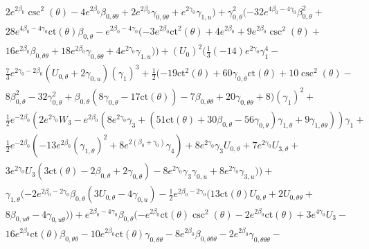 \documentclass[a4paper,11pt]{article}
\numberwithin{equation}{section}
\begin{document}
\begin{align*}
&2 e^{2 \beta_{0}} \csc ^2(\theta )-4 e^{2 \beta_{0}} \beta_{0, \theta \theta}+2 e^{2 \beta_{0}} \gamma_{0, \theta \theta}+e^{2 \gamma_{0}} \gamma_{1,u})+\gamma_{0, \theta}^2 (-32 e^{4 \beta_{0}-4 \gamma_{0}} \beta_{0, \theta}^2+\\
&28 e^{4 \beta_{0}-4 \gamma_{0}} \text{ct}(\theta ) \beta_{0, \theta}-e^{2 \beta_{0}-4 \gamma_{0}} (-3 e^{2 \beta_{0}} \text{ct}^2(\theta )+4 e^{2 \beta_{0}}+9 e^{2 \beta_{0}} \csc ^2(\theta )+\\
&16 e^{2 \beta_{0}} \beta_{0, \theta \theta}+18 e^{2 \beta_{0}} \gamma_{0, \theta \theta}+4 e^{2 \gamma_{0}} \gamma_{1,u}))+(U_{0})^2 (\frac{1}{3} (-14) e^{2 \gamma_{0}} \gamma_{1}^4-\\
&\frac{7}{3} e^{2 \gamma_{0}-2 \beta_{0}} (U_{0, \theta}+2 \gamma_{0,u}) (\gamma_{1})^3+\frac{1}{2} (-19 \text{ct}^2(\theta )+60 \gamma_{0, \theta} \text{ct}(\theta )+10 \csc ^2(\theta )-\\
&8 \beta_{0, \theta}^2-32 \gamma_{0, \theta}^2+\beta_{0, \theta} (8 \gamma_{0, \theta}-17 \text{ct}(\theta ))-7 \beta_{0, \theta \theta}+20 \gamma_{0, \theta \theta}+8) (\gamma_{1})^2+\\
&\frac{1}{2} e^{-2 \beta_{0}} (2 e^{2 \gamma_{0}} W_{3}-e^{2 \beta_{0}} (8 e^{2 \gamma_{0}} \gamma_{3}+(51 \text{ct}(\theta )+30 \beta_{0, \theta}-56 \gamma_{0, \theta}) \gamma_{1, \theta}+9 \gamma_{1, \theta \theta})) \gamma_{1}+\\
&\frac{1}{2} e^{-2 \beta_{0}} (-13 e^{2 \beta_{0}} (\gamma_{1, \theta})^2+8 e^{2 (\beta_{0}+\gamma_{0})}\gamma_{4})+8 e^{2 \gamma_{0}} \gamma_{3} U_{0, \theta}+7 e^{2 \gamma_{0}} U_{3, \theta}+\\
&3 e^{2 \gamma_{0}} U_{3} (3 \text{ct}(\theta )-2 \beta_{0, \theta}+2 \gamma_{0, \theta})-8 e^{2 \gamma_{0}} \gamma_{3} \gamma_{0,u}+8 e^{2 \gamma_{0}} \gamma_{3, u}))+\\
&\gamma_{1, \theta} (-2 e^{2 \beta_{0}-2 \gamma_{0}} \beta_{0, \theta} (3 U_{0, \theta}-4 \gamma_{0,u})-\frac{1}{2} e^{2 \beta_{0}-2 \gamma_{0}} (13 \text{ct}(\theta ) U_{0, \theta}+2 U_{0, \theta \theta}+\\
&8 \beta_{0, u \theta}-4 \gamma_{0, u \theta}))+e^{2 \beta_{0}-4 \gamma_{0}} \beta_{0, \theta} (-e^{2 \beta_{0}} \text{ct}(\theta ) \csc ^2(\theta )-2 e^{2 \beta_{0}} \text{ct}(\theta )+3 e^{4 \gamma_{0}} U_{3}-\\
&16 e^{2 \beta_{0}} \text{ct}(\theta ) \beta_{0, \theta \theta}-10 e^{2 \beta_{0}} \text{ct}(\theta ) \gamma_{0, \theta \theta}-8 e^{2 \beta_{0}} \beta_{0, \theta \theta \theta}-2 e^{2 \beta_{0}} \gamma_{0, \theta \theta \theta}-\\

\end{align*}
\end{document}
